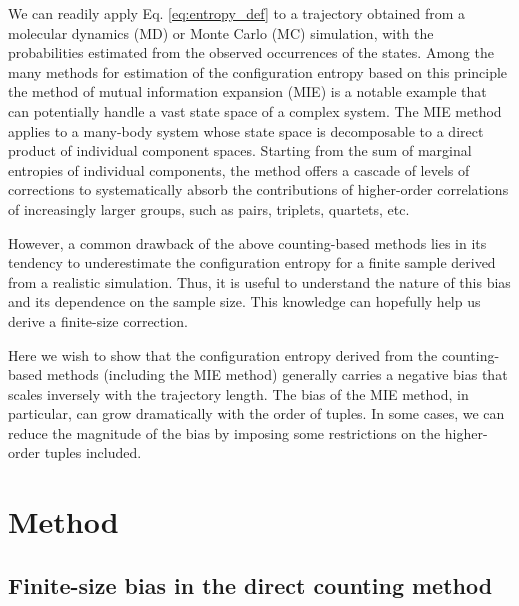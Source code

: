 \documentclass[preprint, superscriptaddress]{revtex4-1}
\begin{document}
We can readily apply Eq. \eqref{eq:entropy_def} to a trajectory
obtained from a molecular dynamics (MD) or Monte Carlo (MC) simulation,
with the probabilities estimated from the observed occurrences of the states.
%
Among the many methods for estimation of the configuration entropy based on this principle
the method of mutual information expansion (MIE) is a notable example
that can potentially handle a vast state space of a complex system.
%
The MIE method applies to a many-body system
 whose state space is decomposable to a direct product of individual component spaces.
%
Starting from the sum of marginal entropies of individual components,
the method offers a cascade of levels of corrections
to systematically absorb the contributions of higher-order correlations
of increasingly larger groups, such as pairs, triplets, quartets, etc.

However, a common drawback of the above counting-based methods
lies in its tendency to underestimate the configuration entropy for a finite sample
derived from a realistic simulation.
%
Thus, it is useful to understand the nature of this bias
and its dependence on the sample size.
%
This knowledge can hopefully help us derive a finite-size correction.

Here we wish to show that the configuration entropy derived
from the counting-based methods (including the MIE method)
generally carries a negative bias that scales inversely with the trajectory length.
%
The bias of the MIE method, in particular,
can grow dramatically with the order of tuples.
%
In some cases, we can reduce the magnitude of the bias
by imposing some restrictions on the higher-order tuples included.

\section{Method}

\subsection{Finite-size bias in the direct counting method}
\end{document}
